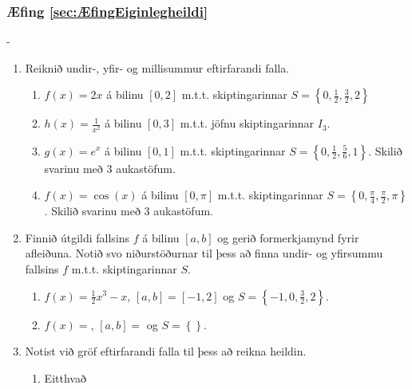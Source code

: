 \subsubsection*{Æfing \ref{sec:ÆfingEiginlegheildi}}
\begin{adjustwidth}{-\hangingaefingar}{}
\begin{enumerate}

\item Reiknið undir-, yfir- og millisummur eftirfarandi falla.
\begin{enumerate}
\setlength\itemsep{4mm}
\item $f(x) = 2x$ á bilinu $[0,2]$ m.t.t. skiptingarinnar $S = \left\{0,\frac{1}{2},\frac{3}{2},2\right\}$

\item $h(x) = \frac{1}{x^{2}}$ á bilinu $[0,3]$ m.t.t. jöfnu skiptingarinnar $I_{3}$.

\item $g(x) = e^{x}$ á bilinu $[0,1]$ m.t.t. skiptingarinnar $S = \left\{0,\frac{1}{2},\frac{5}{6},1\right\}$. Skilið svarinu með $3$ aukastöfum.

\item $f(x) = \cos(x)$ á bilinu $\left[0,\pi\right]$ m.t.t. skiptingarinnar $S = \left\{0,\frac{\pi}{4},\frac{\pi}{2},\pi\right\}$. Skilið svarinu með $3$ aukastöfum.
\end{enumerate}

\vspace{2mm}

\item Finnið útgildi fallsins $f$ á bilinu $[a,b]$ og gerið formerkjamynd fyrir afleiðuna. Notið svo niðurstöðurnar til þess að finna undir- og yfirsummu fallsins $f$ m.t.t. skiptingarinnar $S$.

\begin{enumerate}
\setlength\itemsep{4mm}

\item $f(x) = \frac{1}{2}x^{3}-x$, $[a,b] = \left[-1,2\right]$ og $S = \left\{-1,0,\frac{3}{2},2\right\}$.

\item $f(x) = $, $[a,b] = $ og $S = \left\{\right\}$.
\end{enumerate}

\vspace{2mm}

\item Notist við gröf eftirfarandi falla til þess að reikna heildin.
\begin{enumerate}
\item Eitthvað
\end{enumerate}


\end{enumerate}
\end{adjustwidth}
